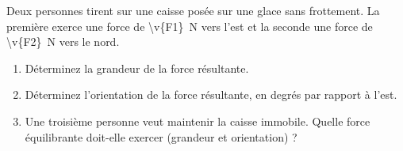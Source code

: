 Deux personnes tirent sur une caisse posée sur une glace sans frottement. La première exerce une force de \qty{\v{F1}}{N} vers l'est et la seconde une force de \qty{\v{F2}}{N} vers le nord.

\begin{enumerate}[label=\alph*)]
    \item Déterminez la grandeur de la force résultante.
    \item Déterminez l'orientation de la force résultante, en degrés par rapport à l'est.
    \item Une troisième personne veut maintenir la caisse immobile. Quelle force équilibrante doit-elle exercer (grandeur et orientation) ?
\end{enumerate}
